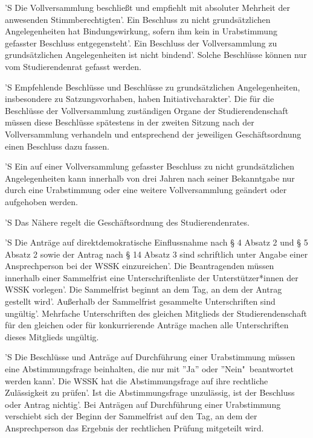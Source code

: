 \documentclass[fontsize=12pt,parskip=half]{scrartcl}
\begin{document}
\begin{contract}
  'S Die Vollversammlung beschließt und empfiehlt mit absoluter Mehrheit der
  anwesenden Stimmberechtigten'. Ein Beschluss zu nicht grundsätzlichen
  Angelegenheiten hat Bindungswirkung, sofern ihm kein in Urabstimmung gefasster
  Beschluss entgegensteht'. Ein Beschluss der Vollversammlung zu grundsätzlichen
  Angelegenheiten ist nicht bindend'. Solche Beschlüsse können nur vom
  Studierendenrat gefasst werden.

  'S Empfehlende Beschlüsse und Beschlüsse zu grundsätzlichen Angelegenheiten,
  insbesondere zu Satzungsvorhaben, haben Initiativcharakter'. Die für die
  Beschlüsse der Vollversammlung zuständigen Organe der Studierendenschaft
  müssen diese Beschlüsse spätestens in der zweiten Sitzung nach der
  Vollversammlung verhandeln und entsprechend der jeweiligen Geschäftsordnung
  einen Beschluss dazu fassen.

  'S Ein auf einer Vollversammlung gefasster Beschluss zu nicht grundsätzlichen
  Angelegenheiten kann innerhalb von drei Jahren nach seiner Bekanntgabe nur
  durch eine Urabstimmung oder eine weitere Vollversammlung geändert oder
  aufgehoben werden.

  'S Das Nähere regelt die Geschäftsordnung des Studierendenrates.



  'S Die Anträge auf direktdemokratische Einflussnahme nach § 4 Absatz 2 und § 5
  Absatz 2 sowie der Antrag nach § 14 Absatz 3 sind schriftlich unter Angabe
  einer Ansprechperson bei der WSSK einzureichen'. Die Beantragenden müssen
  innerhalb einer Sammelfrist eine Unterschriftenliste der Unterstützer*innen
  der WSSK vorlegen'. Die Sammelfrist beginnt an dem Tag, an dem der Antrag
  gestellt wird'. Außerhalb der Sammelfrist gesammelte Unterschriften sind
  ungültig'. Mehrfache Unterschriften des gleichen Mitglieds der
  Studierendenschaft für den gleichen oder für konkurrierende Anträge machen
  alle Unterschriften dieses Mitglieds ungültig.

  'S Die Beschlüsse und Anträge auf Durchführung einer Urabstimmung müssen eine
  Abstimmungsfrage beinhalten, die nur mit ''Ja'' oder ''Nein"\ beantwortet werden
  kann'. Die WSSK hat die Abstimmungsfrage auf ihre rechtliche Zulässigkeit zu
  prüfen'. Ist die Abstimmungsfrage unzulässig, ist der Beschluss oder Antrag
  nichtig'. Bei Anträgen auf Durchführung einer Urabstimmung verschiebt sich der
  Beginn der Sammelfrist auf den Tag, an dem der Ansprechperson das Ergebnis der
  rechtlichen Prüfung mitgeteilt wird.


\end{contract}
\end{document}
